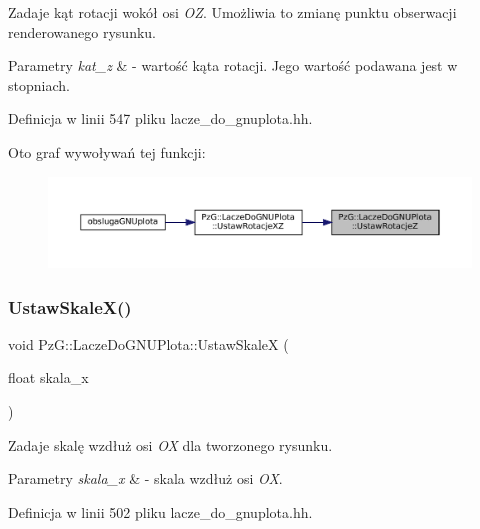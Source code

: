 Zadaje kąt rotacji wokół osi {\itshape OZ}. Umożliwia to zmianę punktu obserwacji renderowanego rysunku. 
\begin{DoxyParams}{Parametry}
{\em kat\+\_\+z} & -\/ wartość kąta rotacji. Jego wartość podawana jest w stopniach. \\
\hline
\end{DoxyParams}


Definicja w linii 547 pliku lacze\+\_\+do\+\_\+gnuplota.\+hh.

Oto graf wywoływań tej funkcji\+:\nopagebreak
\begin{figure}[H]
\begin{center}
\leavevmode
\includegraphics[width=350pt]{class_pz_g_1_1_lacze_do_g_n_u_plota_a458399aa2a8f4b3f00ccd5b272857ea1_icgraph}
\end{center}
\end{figure}
\mbox{\label{class_pz_g_1_1_lacze_do_g_n_u_plota_a855b8338bfe3e5d294d719f24b11090e}} 
\subsubsection{\texorpdfstring{UstawSkaleX()}{UstawSkaleX()}}
{\footnotesize\ttfamily void Pz\+G\+::\+Lacze\+Do\+G\+N\+U\+Plota\+::\+Ustaw\+SkaleX (\begin{DoxyParamCaption}\item[{float}]{skala\+\_\+x }\end{DoxyParamCaption})\hspace{0.3cm}{\ttfamily [inline]}}

Zadaje skalę wzdłuż osi {\itshape OX} dla tworzonego rysunku. 
\begin{DoxyParams}{Parametry}
{\em skala\+\_\+x} & -\/ skala wzdłuż osi {\itshape OX}. \\
\hline
\end{DoxyParams}


Definicja w linii 502 pliku lacze\+\_\+do\+\_\+gnuplota.\+hh.

